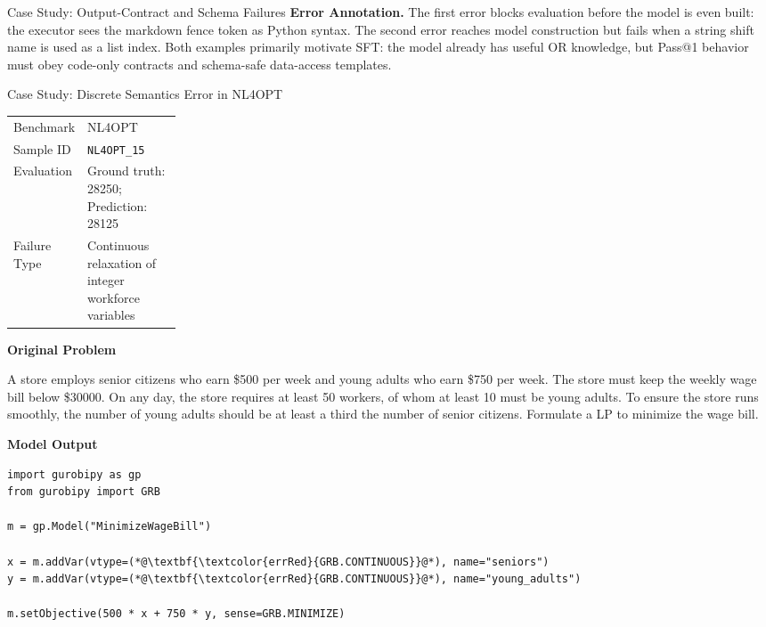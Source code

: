 \begin{casepage}{Case Study: Output-Contract and Schema Failures}
\vspace{0.3em}
\textbf{Error Annotation.}
The first error blocks evaluation before the model is even built: the executor
sees the markdown fence token as Python syntax. The second error reaches
model construction but fails when a string shift name is used as a list index.
Both examples primarily motivate SFT: the model already has useful OR
knowledge, but Pass@1 behavior must obey code-only contracts and schema-safe
data-access templates.

\end{casepage}

\begin{casepage}{Case Study: Discrete Semantics Error in NL4OPT}

\begin{tabularx}{\linewidth}{@{}p{0.22\linewidth}X@{}}
\toprule
Benchmark & NL4OPT \\
Sample ID & \texttt{NL4OPT\_15} \\
Evaluation & Ground truth: 28250; Prediction: 28125 \\
Failure Type & Continuous relaxation of integer workforce variables \\
\bottomrule
\end{tabularx}

\vspace{0.5em}
\textbf{Original Problem}

{\small
A store employs senior citizens who earn \$500 per week and young adults who earn \$750 per week.
The store must keep the weekly wage bill below \$30000.
On any day, the store requires at least 50 workers, of whom at least 10 must be young adults.
To ensure the store runs smoothly, the number of young adults should be at least a third the number of senior citizens.
Formulate a LP to minimize the wage bill.
\par}

\vspace{0.5em}
\textbf{Model Output}

\begin{lstlisting}[style=pythoncase]
import gurobipy as gp
from gurobipy import GRB

m = gp.Model("MinimizeWageBill")

x = m.addVar(vtype=(*@\textbf{\textcolor{errRed}{GRB.CONTINUOUS}}@*), name="seniors")
y = m.addVar(vtype=(*@\textbf{\textcolor{errRed}{GRB.CONTINUOUS}}@*), name="young_adults")

m.setObjective(500 * x + 750 * y, sense=GRB.MINIMIZE)


\end{lstlisting}
\end{casepage}
